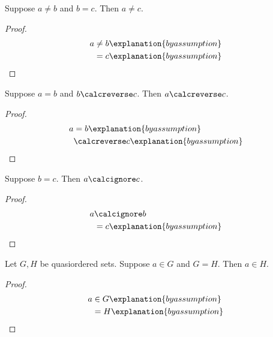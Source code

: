 \begin{proposition}\label{calculation_form_disequality_right}
    Suppose $a\neq b$ and $b=c$.
    Then $a\neq c$.
\end{proposition}
\begin{proof}
    \begin{align*}
        a
            &\neq b
                \explanation{by assumption}
                \\
            &= c
                \explanation{by assumption}
    \end{align*}
\end{proof}

\begin{proposition}\label{calculation_form_reversed}
    Suppose $a=b$ and $b\calcreverse c$.
    Then $a\calcreverse c$.
\end{proposition}
\begin{proof}
    \begin{align*}
        a
            &= b
                \explanation{by assumption}
                \\
            &\calcreverse c
                \explanation{by assumption}
    \end{align*}
\end{proof}

\begin{proposition}\label{calculation_form_ignored_endpoint}
    Suppose $b=c$.
    Then $a\calcignore c$.
\end{proposition}
\begin{proof}
    \begin{align*}
        a
            &\calcignore b
                \\
            &= c
                \explanation{by assumption}
    \end{align*}
\end{proof}

\begin{proposition}\label{calculation_form_carrier}
    Let $G,H$ be quasiordered sets. Suppose $a\in G$ and $G=H$.
    Then $a\in H$.
\end{proposition}
\begin{proof}
    \begin{align*}
        a
            &\in G
                \explanation{by assumption}
                \\
            &= H
                \explanation{by assumption}
    \end{align*}
\end{proof}


